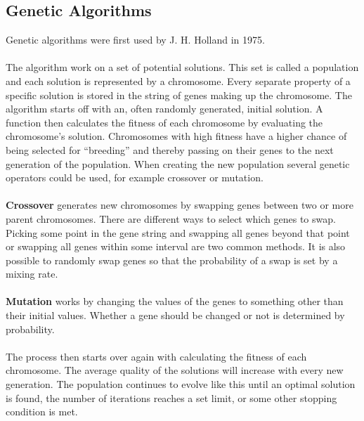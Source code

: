 \documentclass[titlepage,a4paper]{article}
\begin{document}
\subsection{Genetic Algorithms}
Genetic algorithms were first used by J. H. Holland in 1975\cite{timetabling02}.\\\\
The algorithm work on a set of potential solutions. This set is called a population and each solution is represented by a chromosome. Every separate property of a specific solution is stored in the string of genes making up the chromosome. The algorithm starts off with an, often randomly generated, initial solution. A function then calculates the fitness of each chromosome by evaluating the chromosome’s solution. Chromosomes with high fitness have a higher chance of being selected for “breeding” and thereby passing on their genes to the next generation of the population. When creating the new population several genetic operators could be used, for example crossover or mutation\cite{solving12}.  \\\\
\textbf{Crossover} generates new chromosomes by swapping genes between two or more parent chromosomes. There are different ways to select which genes to swap. Picking some point in the gene string and swapping all genes beyond that point or swapping all genes within some interval are two common methods. It is also possible to randomly swap genes so that the probability of a swap is set by a mixing rate. \\\\
\textbf{Mutation} works by changing the values of the genes to something other than their initial values. Whether a gene should be changed or not is determined by probability\cite{anApp05}. \\\\
The process then starts over again with calculating the fitness of each chromosome. The average quality of the solutions will increase with every new generation. The population continues to evolve like this until an optimal solution is found, the number of iterations reaches a set limit, or some other stopping condition is met. \\\\
\end{document}
